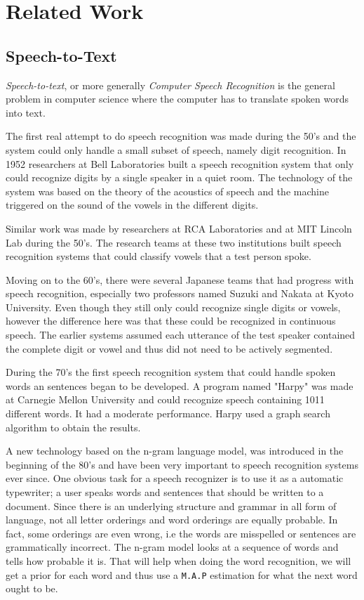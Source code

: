 \documentclass[a4paper,12pt,twoside]{ltxdoc}
\begin{document}
\section{Related Work}
\subsection{Speech-to-Text}
\emph{Speech-to-text}, or more generally \emph{Computer Speech Recognition} is the general problem in computer science where the computer has to translate spoken words into text.

The first real attempt to do speech recognition was made during the 50's and the system could only handle a small subset of speech, namely digit recognition. In 1952 researchers at Bell Laboratories built a speech recognition system that only could recognize digits by a single speaker in a quiet room. The technology of  the system was based on the theory of the acoustics of speech and the machine triggered on the sound of the vowels in the different digits.

Similar work was made by researchers at RCA Laboratories and at MIT Lincoln Lab during the 50's. The research teams at these two institutions built speech recognition systems that could classify vowels that a test person spoke.

Moving on to the 60's, there were several Japanese teams that had progress with speech recognition, especially two professors named Suzuki and Nakata at Kyoto University. Even though they still only could recognize single digits or vowels, however the difference here was that these could be recognized in continuous speech. The earlier systems assumed each utterance of the test speaker contained the complete digit or vowel and thus did not need to be actively segmented.  

During the 70's the first speech recognition system that could handle spoken words an sentences began to be developed. A program named "Harpy" was made at Carnegie Mellon University and could recognize speech containing 1011 different words. It had a moderate performance. Harpy used a graph search algorithm to obtain the results. 

A new technology based on the n-gram language model, was introduced in the beginning of the 80's and have been very important to speech recognition systems ever since. One obvious task for a speech recognizer is to use it as a automatic typewriter; a user speaks words and sentences that should be written to a document. Since there is an underlying structure and grammar in all form of language, not all letter orderings and word orderings are equally probable. In fact, some orderings are even wrong, i.e the words are misspelled or sentences are grammatically incorrect. The n-gram model looks at a sequence of words and tells how probable it is. That will help when doing the word recognition, we will get a prior for each word and thus use a \verb#M.A.P# estimation for what the next word ought to be.
\end{document}
